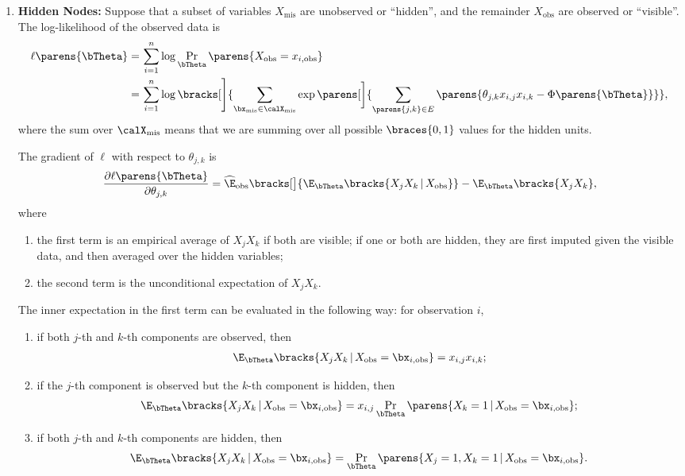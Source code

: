 \documentclass[12pt]{article}
\begin{document}
\begin{enumerate}[label=\textbf{\arabic*.}]
	\item \textbf{Hidden Nodes:} Suppose that a subset of variables $X_{\mathrm{mis}}$ are unobserved or ``hidden'', and the remainder $X_{\mathrm{obs}}$ are observed or ``visible''. The log-likelihood of the observed data is 
	\begin{align*}
		\ell \parens{\bTheta} = & \, \sum_{i=1}^n \log \Pr_{\bTheta} \parens{X_{\mathrm{obs}} = x_{i, \mathrm{obs}}} \\ 
		= & \, \sum_{i=1}^n \log \bracks[\Bigg]{\sum_{\bx_{\mathrm{mis}} \in \calX_{\mathrm{mis}}} \exp \parens[\bigg]{\sum_{\parens{j, k} \in E} \parens{\theta_{j, k} x_{i, j} x_{i, k} - \Phi \parens{\bTheta}}}}, 
	\end{align*}
	where the sum over $\calX_{\mathrm{mis}}$ means that we are summing over all possible $\braces{0, 1}$ values for the hidden units. 
	
	The gradient of $\ell$ with respect to $\theta_{j,k}$ is 
	\begin{align}
		\frac{\partial \ell \parens{\bTheta}}{\partial \theta_{j,k}} = \widehat{\E}_{\mathrm{obs}}\bracks[\big]{\E_{\bTheta} \bracks{X_j X_k \,\vert\, X_{\mathrm{obs}}}} - \E_{\bTheta} \bracks{X_j X_k}, 
	\end{align}
	where 
	\begin{enumerate}
		\item the first term is an empirical average of $X_jX_k$ if both are visible; if one or both are hidden, they are first imputed given the visible data, and then averaged over the hidden variables; 
		\item the second term is the unconditional expectation of $X_jX_k$.  
	\end{enumerate}
	The inner expectation in the first term can be evaluated in the following way: for observation $i$, 
	\begin{enumerate}
		\item if both $j$-th and $k$-th components are observed, then 
		\begin{align*}
			\E_{\bTheta} \bracks{X_j X_k \,\vert\, X_{\mathrm{obs}} = \bx_{i, \mathrm{obs}}} = x_{i,j} x_{i,k}; 
		\end{align*}
		\item if the $j$-th component is observed but the $k$-th component is hidden, then 
		\begin{align*}
			\E_{\bTheta} \bracks{X_j X_k \,\vert\, X_{\mathrm{obs}} = \bx_{i, \mathrm{obs}}} = x_{i,j} \Pr_{\bTheta} \parens{X_k = 1 \,\vert\, X_{\mathrm{obs}} = \bx_{i, \mathrm{obs}}}; 
		\end{align*}
		\item if both $j$-th and $k$-th components are hidden, then 
		\begin{align*}
			\E_{\bTheta} \bracks{X_j X_k \,\vert\, X_{\mathrm{obs}} = \bx_{i, \mathrm{obs}}} = \Pr_{\bTheta}\parens{X_j = 1, X_k = 1 \,\vert\, X_{\mathrm{obs}} = \bx_{i, \mathrm{obs}}}. 
		\end{align*}
	\end{enumerate}
	
\end{enumerate}

\printbibliography
\end{document}
